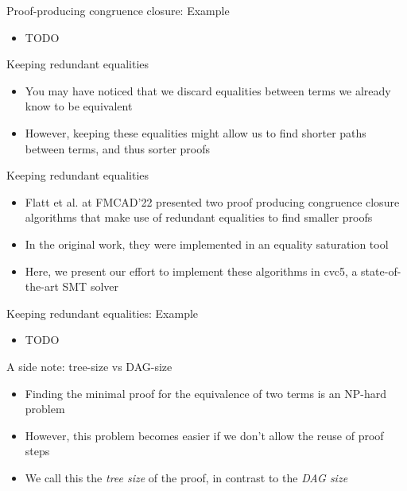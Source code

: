 \documentclass[aspectratio=169]{beamer}
\newcommand\vitem{\vfill\item}
\newcommand\pvitem{\pause\vfill\item}
\begin{document}

\begin{frame}{Proof-producing congruence closure: Example}
  \begin{itemize}
    \item TODO
  \end{itemize}
\end{frame}

\begin{frame}{Keeping redundant equalities}
  \begin{itemize}
    \item You may have noticed that we discard equalities between terms we
    already know to be equivalent
    \vitem However, keeping these equalities might allow us to find shorter
    paths between terms, and thus sorter proofs
  \end{itemize}
\end{frame}

\begin{frame}{Keeping redundant equalities}
  \begin{itemize}
    \item Flatt et al. at FMCAD'22 presented two proof producing congruence
    closure algorithms that make use of redundant equalities to find smaller
    proofs
    \pvitem In the original work, they were implemented in an equality
    saturation tool
    \pvitem Here, we present our effort to implement these algorithms in cvc5, a
    state-of-the-art SMT solver
  \end{itemize}
\end{frame}

\begin{frame}{Keeping redundant equalities: Example}
  \begin{itemize}
    \item TODO
  \end{itemize}
\end{frame}

\begin{frame}{A side note: tree-size vs DAG-size}
  \begin{itemize}
    \item Finding the minimal proof for the equivalence of two terms is an
    NP-hard problem
    \vitem However, this problem becomes easier if we don't allow the reuse of
    proof steps
    \pvitem We call this the \emph{tree size} of the proof, in contrast to the
    \emph{DAG size}
  \end{itemize}
\end{frame}
\end{document}
